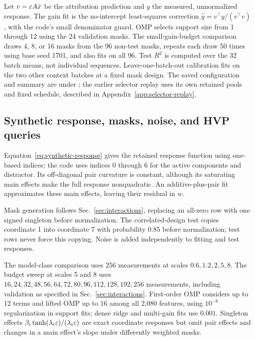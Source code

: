 Let $v=\varepsilon A\bar x$ be the attribution prediction and $y$ the measured, unnormalized response. The gain fit is the no-intercept least-squares correction $\widehat g=v^\top y/(v^\top v)$, with the code's small denominator guard. OMP selects support size from 1 through 12 using the 24 validation masks. The small-gain-budget comparison draws 4, 8, or 16 masks from the 96 non-test masks, repeats each draw 50 times using base seed 1701, and also fits on all 96. Test $R^2$ is computed over the 32 batch means, not individual sequences. Leave-one-batch-out calibration fits on the two other context batches at a fixed mask design. The saved configuration and summary are under ; the earlier selector replay uses its own retained pools and fixed schedule, described in Appendix~\ref{app:selector-replay}.

\subsection{Synthetic response, masks, noise, and HVP queries}\label{app:synthetic-setup}

Equation~\ref{eq:synthetic-response} gives the retained response function using one-based indices; the code uses indices 0 through 6 for the active components and distractor. Its off-diagonal pair curvature is constant, although its saturating main effects make the full response nonquadratic. An additive-plus-pair fit approximates these main effects, leaving their residual in $w$.

Mask generation follows Sec.~\ref{sec:interactions}, replacing an all-zero row with one signed singleton before normalization. The correlated-design test copies coordinate 1 into coordinate 7 with probability $0.85$ before normalization; test rows never force this copying. Noise is added independently to fitting and test responses.

The model-class comparison uses 256 measurements at scales $0.6,1.2,2,5,8$. The budget sweep at scales 5 and 8 uses $16,24,32,48,56,64,72,80,96,112,128,192,256$ measurements, including validation as specified in Sec.~\ref{sec:interactions}. First-order OMP considers up to 12 terms and lifted OMP up to 16 among all 2,080 features, using $10^{-8}$ regularization in support fits; dense ridge and multi-gain fits use $0.001$. Singleton effects $\beta_i\tanh(\lambda_i\varepsilon)/(\lambda_i\varepsilon)$ are exact coordinate responses but omit pair effects and changes in a main effect's slope under differently weighted masks.

